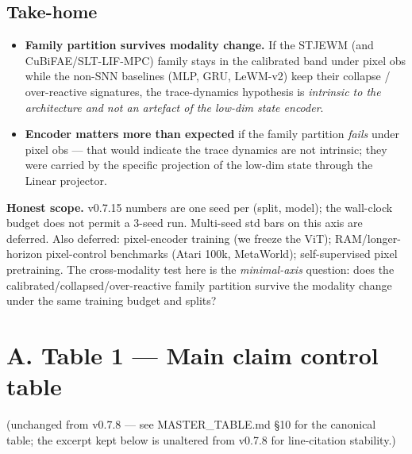 \documentclass{article}
\begin{document}
\subsection{Take-home}

\begin{itemize}
\item \textbf{Family partition survives modality change.} If the
STJEWM (and CuBiFAE/SLT-LIF-MPC) family stays in the calibrated band under
pixel obs while the non-SNN baselines (MLP, GRU, LeWM-v2) keep their collapse /
over-reactive signatures, the trace-dynamics hypothesis is
\emph{intrinsic to the architecture and not an artefact of the low-dim state encoder}.
\item \textbf{Encoder matters more than expected} if the family partition
\emph{fails} under pixel obs --- that would indicate the trace dynamics are
not intrinsic; they were carried by the specific projection of the
low-dim state through the Linear projector.
\end{itemize}

\textbf{Honest scope.} v0.7.15 numbers are one seed per (split, model); the
wall-clock budget does not permit a 3-seed run. Multi-seed std bars on
this axis are deferred. Also deferred: pixel-encoder training (we freeze
the ViT); RAM/longer-horizon pixel-control benchmarks (Atari 100k, MetaWorld);
self-supervised pixel pretraining. The cross-modality test here is the
\emph{minimal-axis} question: does the calibrated/collapsed/over-reactive family
partition survive the modality change under the same training budget and
splits?

\section*{A. Table 1 --- Main claim control table}

\noindent (unchanged from v0.7.8 --- see MASTER\_TABLE.md §10 for the canonical table; the
excerpt kept below is unaltered from v0.7.8 for line-citation stability.)
\end{document}
